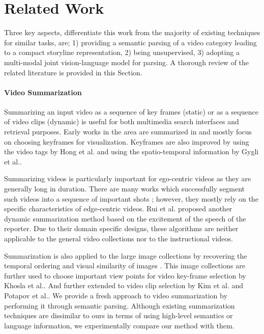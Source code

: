 \section{Related Work}
Three key aspects, differentiate this work from the majority of existing techniques for similar tasks, are; 1) providing a semantic parsing of a video category leading to a compact storyline representation, 2) being unsupervised, 3) adopting a multi-modal joint vision-language model for parsing. A thorough review of the related literature is provided in this Section.

\paragraph{Video Summarization}
Summarizing an input video as a sequence of key frames (static) or as a sequence of video clips (dynamic) is useful for both multimedia search interfaces and retrieval purposes. Early works in the area are summarized in \cite{vidAbstraction} and mostly focus on choosing keyframes for visualization. Keyframes are also improved by using the video tags by Hong et al.\cite{beyondSearch} and using the spatio-temporal information by Gygli et al.\cite{createSum}.

Summarizing videos is particularly important for ego-centric videos as they are generally long in duration. There are many works which successfully segment such videos into a sequence of important shots \cite{lee2012discovering, lu2013story}; however, they mostly rely on the specific characteristics of edge-centric videos. Rui et al. \cite{rui2000automatically} proposed another dynamic summarization method based on the excitement of the speech of the reporter. Due to their domain specific designs, these algorithms are neither applicable to the general video collections nor to the instructional videos.

Summarization is also applied to the large image collections by recovering the temporal ordering and visual similarity of images \cite{storyGraph}. This image collections are further used to choose important view points for video key-frame selection by Khosla et al.\cite{khosla2013large}. And further extended to video clip selection by Kim et al.\cite{kim2014joint} and Potapov et al.\cite{potapov2014category}. We provide a fresh approach to video summarization by performing it through semantic parsing. Although existing summarization techniques are dissimilar to ours in terms of using high-level semantics or language information, we experimentally compare our method with them.


